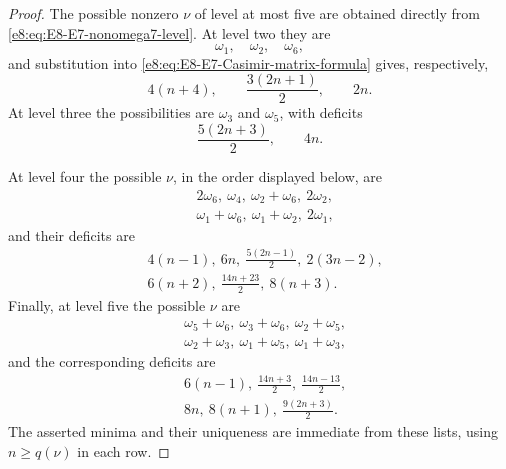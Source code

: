 \documentclass[11pt,reqno]{amsart}
\theoremstyle{definition}
\theoremstyle{remark}
\begin{document}
\begin{proof}
The possible nonzero $\nu$ of level at most five are obtained directly from
\eqref{e8:eq:E8-E7-nonomega7-level}.  At level two they are
\begin{equation*}
  \omega_1,\quad\omega_2,\quad\omega_6,
\end{equation*}
and substitution into
\eqref{e8:eq:E8-E7-Casimir-matrix-formula} gives, respectively,
\begin{equation*}
  4(n+4),\qquad
  \frac{3(2n+1)}2,
  \qquad 2n.
\end{equation*}
At level three the possibilities are $\omega_3$ and $\omega_5$, with
deficits
\begin{equation*}
  \frac{5(2n+3)}2,
  \qquad 4n.
\end{equation*}

At level four the possible $\nu$, in the order displayed below, are
\begin{equation*}
 \begin{split}
  &2\omega_6,\ \omega_4,\ \omega_2+\omega_6,\ 2\omega_2,\\
  &\omega_1+\omega_6,\ \omega_1+\omega_2,\ 2\omega_1,
 \end{split}
\end{equation*}
and their deficits are
\begin{equation*}
 \begin{split}
  &4(n-1),\ 6n,\ \frac{5(2n-1)}2,\ 2(3n-2),\\
  &6(n+2),\ \frac{14n+23}{2},\ 8(n+3).
 \end{split}
\end{equation*}
Finally, at level five the possible $\nu$ are
\begin{equation*}
 \begin{split}
  &\omega_5+\omega_6,\ \omega_3+\omega_6,\
    \omega_2+\omega_5,\\
  &\omega_2+\omega_3,\ \omega_1+\omega_5,\
    \omega_1+\omega_3,
 \end{split}
\end{equation*}
and the corresponding deficits are
\begin{equation*}
 \begin{split}
  &6(n-1),\ \frac{14n+3}{2},\ \frac{14n-13}{2},\\
  &8n,\ 8(n+1),\ \frac{9(2n+3)}2.
 \end{split}
\end{equation*}
The asserted minima and their uniqueness are immediate from these lists,
using $n\ge q(\nu)$ in each row.
\end{proof}
\end{document}
